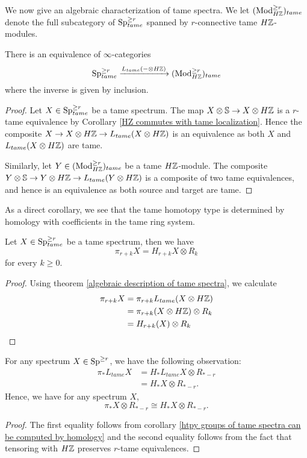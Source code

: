 We now give an algebraic characterization of tame spectra. We let $(\operatorname{Mod}^{\geq r}_{H{\mathbb{Z}}})_{tame}$ denote the full subcategory of $\operatorname{Sp}^{\geq r}_{tame}$ spanned by $r$-connective tame $H{\mathbb{Z}}$-modules.

\begin{theorem}
	\label{algebraic description of tame spectra}
	There is an equivalence of $\infty$-categories
	$$
	\operatorname{Sp}^{\geq r}_{tame} \xrightarrow{L_{tame}(-\otimes H{\mathbb{Z}})} (\operatorname{Mod}^{\geq r}_{H{\mathbb{Z}}})_{tame}
	$$
	where the inverse is given by inclusion.
\end{theorem}
\begin{proof}
	Let $X\in \operatorname{Sp}^{\geq r}_{tame}$ be a tame spectrum. The map $X\otimes {\mathbb{S}} \to X\otimes H{\mathbb{Z}}$ is a $r$-tame equivalence by Corollary \ref{HZ commutes with tame localization}. Hence the composite $X \to X\otimes H{\mathbb{Z}} \to L_{tame}(X\otimes H{\mathbb{Z}})$ is an equivalence as both $X$ and $L_{tame}(X\otimes H{\mathbb{Z}})$ are tame.
	
	Similarly, let $Y\in (\operatorname{Mod}^{\geq r}_{H{\mathbb{Z}}})_{tame}$ be a tame $H{\mathbb{Z}}$-module. The composite $Y\otimes {\mathbb{S}} \to  Y\otimes H{\mathbb{Z}} \to L_{tame}(Y\otimes H{\mathbb{Z}})$ is a composite of two tame equivalences, and hence is an equivalence as both source and target are tame.
	\end{proof}
	

As a direct corollary, we see that the tame homotopy type is determined by homology with coefficients in the tame ring system.
\begin{corollary}
\label{htpy groups of tame spectra can be computed by homology}
	Let $X\in \operatorname{Sp}^{\geq r}_{tame}$ be a tame spectrum, then we have 
	\[
	\pi_{r+k}X = H_{r+k}X \otimes R_k
	\]
	for every $k\geq 0$.
\end{corollary}
	
\begin{proof}
	Using theorem \ref{algebraic description of tame spectra}, we calculate
	\begin{align*}
		\pi_{r+k}X  &= \pi_{r+k}L_{tame}(X\otimes H{\mathbb{Z}})\\
		& =\pi_{r+k}(X\otimes H{\mathbb{Z}})\otimes R_k\\
		& = H_{r+k}(X)\otimes R_k
	\end{align*}
\end{proof}

\begin{corollary}
		For any spectrum $X\in \operatorname{Sp}^{\geq r}$, we have the following observation:
\begin{align*}
	\pi_* L_{tame}X & = H_* L_{tame}X \otimes R_{*-r}\\
		& = H_* X \otimes R_{*-r}.
\end{align*}
Hence, we have for any spectrum $X$,
\[
\pi_*X \otimes R_{*-r}\cong H_*X \otimes R_{*-r}.
\]
\end{corollary}
\begin{proof}
	The first equality follows from corollary \ref{htpy groups of tame spectra can be computed by homology} and the second equality follows from the fact that tensoring with $H{\mathbb{Z}}$ preserves $r$-tame equivalences.
\end{proof}


